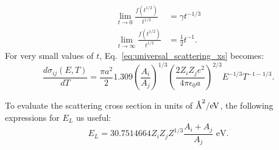 \documentclass[review]{elsarticle}
\newcommand{\angstrom}{\text{\normalfont\AA}}
\begin{document}
\begin{align}
   \lim\limits_{t \rightarrow 0} \frac{f\left(t^{1/2}\right)}{t^{1/2}} &=\gamma t^{-1/3} \nonumber \\
   \lim\limits_{t \rightarrow \infty} \frac{f\left(t^{1/2}\right)}{t^{1/2}} &= \frac{1}{2} t^{-1}.
\end{align}
For very small values of $t$, Eq.~\ref{eq:universal_scattering_xs} becomes:
\begin{equation}\label{eq:thomas_fermi_lowt}
  \frac{d \sigma_{ij}(E,T)}{dT} = \frac{\pi a^2}{2} 1.309 \left( \frac{A_i}{A_j}\right)^{1/3} \left( \frac{2 Z_i Z_j e^2}{4 \pi \epsilon_0 a} \right)^{2/3} E^{-1/3} T^{-1-1/3}.
\end{equation}

To evaluate the scattering cross section in units of $\angstrom^2/\text{eV}$, the following expressions for $E_L$ us useful:
\begin{equation}
   E_L = 30.7514664  Z_i  Z_j  Z^{1/3}  \frac{A_i + A_j}{A_j} \text{ eV}.
\end{equation}
\end{document}
